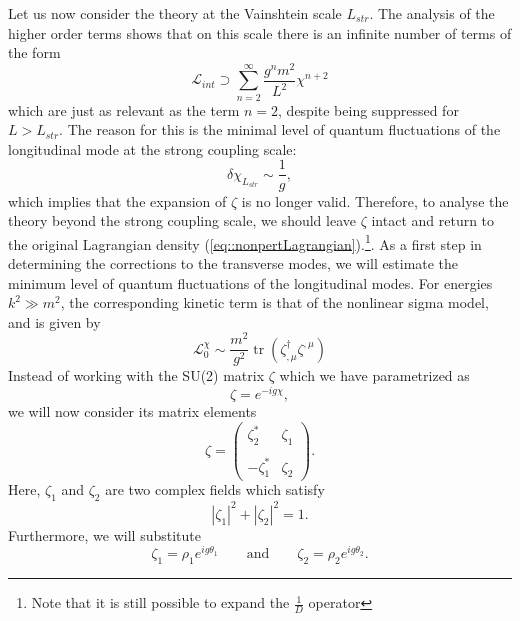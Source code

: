 \documentclass{article}
\DeclareMathOperator{\tr}{tr}
\begin{document}
Let us now consider the theory at the Vainshtein scale $L_{str}$. The analysis of the higher order terms shows that on this scale there is an infinite number of terms of the form 
\begin{equation}
    \mathcal L_{int}\supset \sum_{n=2}^{\infty}\frac{g^nm^2}{L^2}\chi^{n+2}
\end{equation}
which are just as relevant as the term $n=2$, despite being suppressed for $L>L_{str}$. The reason for this is the minimal level of quantum fluctuations of the longitudinal mode at the strong coupling scale:
\begin{equation}
   \delta\chi_{L_{str}}\sim\frac{1}{g},
\end{equation}
which implies that the expansion of $\zeta$ is no longer valid. Therefore, to analyse the theory beyond the strong coupling scale, we should leave $\zeta$ intact and return to the original Lagrangian density (\ref{eq::nonpertLagrangian}).\footnote{Note that it is still possible to expand the $\frac{1}{D}$ operator}. As a first step in determining the corrections to the transverse modes, we will estimate the minimum level of quantum fluctuations of the longitudinal modes. For energies $k^2\gg m^2$, the corresponding kinetic term is that of the nonlinear sigma model, and is given by 
\begin{equation}\label{eq::nonlinsigmamodel}
    \mathcal{L}_0^{\chi}\sim\frac{m^2}{g^2}\tr\left(\zeta^{\dagger}_{,\mu}\zeta^{,\mu}\right)
\end{equation}
Instead of working with the SU(2) matrix $\zeta$ which we have parametrized as
\begin{equation}
    \zeta=e^{-ig\chi},
\end{equation}
we will now consider its matrix elements 
\begin{equation}
    \zeta=\begin{pmatrix}
     \zeta_2^* & \zeta_1 \\\\
     -\zeta_1^* & \zeta_2
\end{pmatrix}.
\end{equation}
Here, $\zeta_1$ and $\zeta_2$ are two complex fields which satisfy 
\begin{equation}\label{eq::circle}
    |\zeta_1|^2+|\zeta_2|^2=1.
\end{equation}
Furthermore, we will substitute
\begin{equation}\label{eq::subst}
    \zeta_1=\rho_1e^{ig\theta_1}\qquad\text{and}\qquad \zeta_2=\rho_2e^{ig\theta_2}.
\end{equation}
\end{document}
